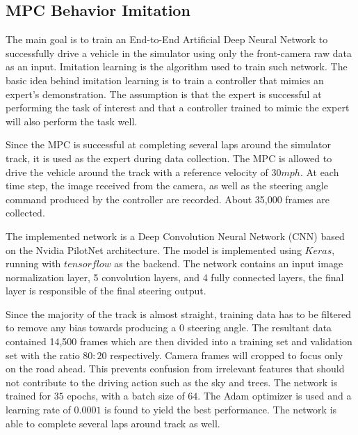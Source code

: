        	\subsection{MPC Behavior Imitation}
        The main goal is to train an End-to-End Artificial Deep Neural Network to successfully drive a vehicle in the simulator using only the front-camera raw data as an input. Imitation learning is the algorithm used to train such network. The basic idea behind imitation learning is to train a controller that mimics an expert's demonstration. The assumption is that the expert is successful at performing the task of interest and that a controller trained to mimic the expert will also perform the task well.

Since the MPC is successful at completing several laps around the simulator track, it is used as the expert during data collection. The MPC is allowed to drive the vehicle around the track with a reference velocity of \(30 mph\). At each time step, the image received from the camera, as well as the steering angle command produced by the controller are recorded. About 35,000 frames are collected.

The implemented network is a Deep Convolution Neural Network (CNN) based on the Nvidia PilotNet architecture\cite{nvidia}. The model is implemented using \(Keras\), running with \(tensorflow\) as the backend. The network contains an input image normalization layer, 5 convolution layers, and 4 fully connected layers, the final layer is responsible of the final steering output.

Since the majority of the track is almost straight, training data has to be filtered to remove any bias towards producing a \(0\) steering angle. The resultant data contained 14,500 frames which are then divided into a training set and validation set with the ratio \(80:20\) respectively. Camera frames will cropped to focus only on the road ahead. This prevents confusion from irrelevant features that should not contribute to the driving action such as the sky and trees. The network is trained for \(35\) epochs, with a batch size of \(64\). The Adam optimizer is used \cite{adam} and a learning rate of \(0.0001\) is found to yield the best performance. The network is able to complete several laps around track as well.


    